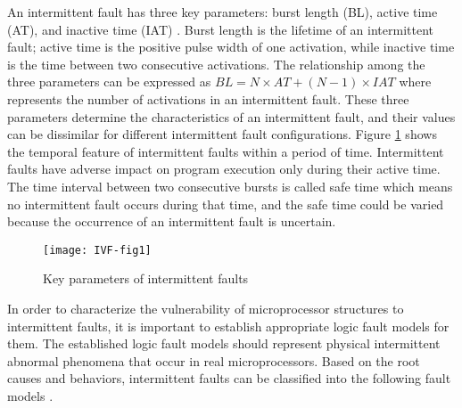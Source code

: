 An intermittent fault has three key parameters: burst length (BL), active time (AT), and inactive time (IAT) \cite{gracia2008analysis}. Burst length is the lifetime of an intermittent fault; active time is the positive pulse width of one activation, while inactive time is the time between two consecutive activations. The relationship among the three parameters can be expressed as $BL=N \times {AT} + (N - 1) \times IAT$ where represents the number of activations in an intermittent fault. These three parameters determine the characteristics of an intermittent fault, and their values can be dissimilar for different intermittent fault configurations. Figure \ref{fig:intermittent-faults} shows the temporal feature of intermittent faults within a period of time. Intermittent faults have adverse impact on program execution only during their active time. The time interval between two consecutive bursts is called safe time which means no intermittent fault occurs during that time, and the safe time could be varied because the occurrence of an intermittent fault is uncertain.

\begin{figure}[t]
\centering
\texttt{[image: IVF-fig1]}
\caption{Key parameters of intermittent faults}
\label{fig:intermittent-faults} 
\end{figure}

In order to characterize the vulnerability of microprocessor structures to intermittent faults, it is important to establish appropriate logic fault models for them. The established logic fault models should represent physical intermittent abnormal phenomena that occur in real microprocessors. Based on the root causes and behaviors, intermittent faults can be classified into the following fault models \cite{gracia2008analysis} \cite{gil2003study}.

